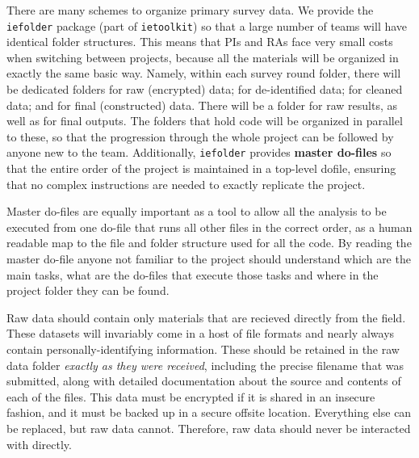 There are many schemes to organize primary survey data.
We provide the \texttt{iefolder}
package (part of \texttt{ietoolkit}) so that
a large number of teams will have identical folder structures.
This means that PIs and RAs face very small costs
when switching between projects, because all the materials
will be organized in exactly the same basic way.
Namely, within each survey round folder,
there will be dedicated folders for raw (encrypted) data;
for de-identified data; for cleaned data; and for final (constructed) data.
There will be a folder for raw results, as well as for final outputs.
The folders that hold code will be organized in parallel to these,
so that the progression through the whole project can be followed
by anyone new to the team. Additionally, \texttt{iefolder}
provides \textbf{master do-files} so that the entire order
of the project is maintained in a top-level dofile,
ensuring that no complex instructions are needed
to exactly replicate the project.

Master do-files are equally important as a tool to allow all the analysis to 
be executed from one do-file that runs all other files in the correct order, 
as a human readable map to the file and folder structure used for all the 
code. By reading the master do-file anyone not familiar to the project should 
understand which are the main tasks, what are the do-files that execute those 
tasks and where in the project folder they can be found.

Raw data should contain only materials that are recieved directly from the field.
These datasets will invariably come in a host of file formats
and nearly always contain personally-identifying information.
These should be retained in the raw data folder
\textit{exactly as they were received},
including the precise filename that was submitted,
along with detailed documentation about the source and contents
of each of the files. This data must be encrypted
if it is shared in an insecure fashion,
and it must be backed up in a secure offsite location.
Everything else can be replaced, but raw data cannot.
Therefore, raw data should never be interacted with directly.

